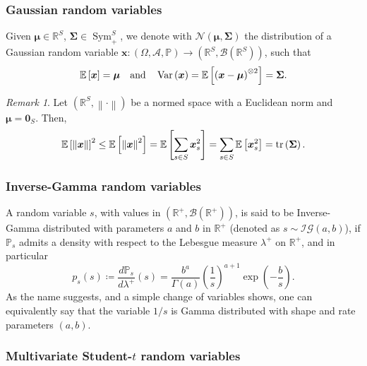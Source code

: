 \documentclass[a4paper, 11pt, reqno]{amsart}
\theoremstyle{plain}
\theoremstyle{remark}
\newtheorem{remark}[theorem]{Remark}
\theoremstyle{definition}
\newcommand{\mean}[2][\kern-0.5pt]{\mathbb{E}_{#1}\left[#2\right]}
\newcommand{\var}[1]{\operatorname{Var}\left(#1\right)}
\newcommand{\normal}[2]{\mathcal{N}\left(#1, #2\right)}
\newcommand{\invgamma}[2]{\mathcal{IG}\left(#1, #2\right)}
\newcommand{\real}{\mathbb{R}}
\newcommand{\borel}[1]{\mathcal{B}\left(#1\right)}
\newcommand{\norm}[1]{\left\lVert#1\right\rVert}
\renewcommand{\exp}[1]{\operatorname{exp}\left(#1\right)}
\newcommand{\trace}[1]{\operatorname{tr}\left(#1\right)}
\begin{document}
\subsubsection{Gaussian random variables}

Given $\bm{\mu} \in \real^S$, $\bm{\Sigma} \in \operatorname{Sym}_+^{S}$, we denote with $\normal{\bm{\mu}}{\bm{\Sigma}}$ the distribution of a Gaussian random variable $\bm{x}: (\Omega, \mathcal{A}, \mathbb{P}) \to (\real^S, \borel{\real^S})$, such that
\begin{equation*}
	\mean{\bm{x}} = \bm{\mu} \quad \text{and} \quad \var{\bm{x}} = \mean{\left(\bm{x} - \bm{\mu}\right)^{\otimes 2}} = \bm{\Sigma}.
\end{equation*}
\begin{remark} \label{rem:gaussmoments} 
	Let $\left(\real^S, \norm{\cdot}\right)$ be a normed space with a Euclidean norm and $\bm{\mu} = \bm{0}_S$. Then,
	\begin{equation*}
	\mean{\norm{\bm{x}}}^2 \leq \mean{\norm{\bm{x}}^2} = \mean{\sum_{s \in S} \bm{x}_s^2} = \sum_{s \in S} \mean{\bm{x}_s^2} = \trace{\bm{\Sigma}}.
	\end{equation*}
\end{remark}

\subsubsection{Inverse-Gamma random variables}

A random variable $s$, with values in $\left(\real^+, \borel{\real^+}\right)$, is said to be Inverse-Gamma distributed with parameters $a$ and $b$ in $\real^+$ (denoted as $s \sim \invgamma{a}{b}$), if $\mathbb{P}_{s}$ admits a density with respect to the Lebesgue measure $\lambda^+$ on $\real^+$, and in particular
\begin{equation*}
	p_s(s) \coloneqq \frac{d\mathbb{P}_{s}}{d\lambda^+}(s) = \frac{b^a}{\Gamma(a)} \left(\frac{1}{s}\right)^{a + 1} \exp{-\frac{b}{s}}.
\end{equation*}
As the name suggests, and a simple change of variables shows, one can equivalently say that the variable $1 / s$ is Gamma distributed with shape and rate parameters $(a, b)$.

\subsubsection{Multivariate \texorpdfstring{Student-$t$}{Student-t} random variables}
\end{document}
